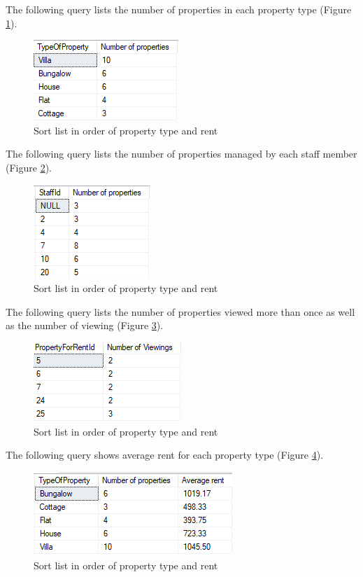 \documentclass[10pt,a4paper]{article}
\begin{document}
The following query lists the number of properties in each property type (Figure \ref{6-Number-properties}).

\begin{figure}[hbtp]
	\centering
	\includegraphics[scale=1]{6-Number-properties.PNG}
	\caption{Sort list in order of property type and rent}
	\label{6-Number-properties}
	\end{figure}
The following query lists the number of properties managed by each staff member (Figure \ref{7-properties-staff}).

\begin{figure}[hbtp]
	\centering
	\includegraphics[scale=1]{7-properties-staff.PNG}
	\caption{Sort list in order of property type and rent}
	\label{7-properties-staff}
	\end{figure}
The following query lists the number of properties viewed more than once as well as the number of viewing (Figure \ref{8-Number-viewings}).

\begin{figure}[hbtp]
	\centering
	\includegraphics[scale=1]{8-Number-viewings.PNG}
	\caption{Sort list in order of property type and rent}
	\label{8-Number-viewings}
	\end{figure}
The following query shows average rent for each property type (Figure \ref{9-Average-rent}).

\begin{figure}[hbtp]
	\centering
	\includegraphics[scale=1]{9-Average-rent.PNG}
	\caption{Sort list in order of property type and rent}
	\label{9-Average-rent}
	\end{figure}
\end{document}
